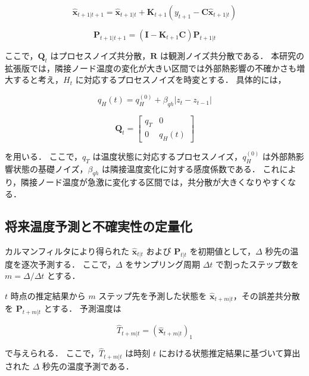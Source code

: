 \documentclass[techrep]{ipsj}
\begin{document}
\begin{equation}
\hat{\mathbf{x}}_{t+1|t+1}
=
\hat{\mathbf{x}}_{t+1|t}
+
\mathbf{K}_{t+1}
\left(
y_{t+1}
-
\mathbf{C}\hat{\mathbf{x}}_{t+1|t}
\right)
\end{equation}

\begin{equation}
\mathbf{P}_{t+1|t+1}
=
\left(
\mathbf{I}
-
\mathbf{K}_{t+1}\mathbf{C}
\right)
\mathbf{P}_{t+1|t}
\end{equation}

ここで，$\mathbf{Q}_t$ はプロセスノイズ共分散，$\mathbf{R}$ は観測ノイズ共分散である．
本研究の拡張版では，隣接ノード温度の変化が大きい区間では外部熱影響の不確かさも増大すると考え，$H_t$ に対応するプロセスノイズを時変とする．
具体的には，

\begin{equation}
q_H(t)
=
q_H^{(0)} + \beta_{qh} |z_t - z_{t-1}|
\end{equation}


\begin{equation}
\mathbf{Q}_t
=
\begin{bmatrix}
q_T & 0 \\
0 & q_H(t)
\end{bmatrix}
\end{equation}

を用いる．
ここで，$q_T$ は温度状態に対応するプロセスノイズ，$q_H^{(0)}$ は外部熱影響状態の基礎ノイズ，$\beta_{qh}$ は隣接温度変化に対する感度係数である．
これにより，隣接ノード温度が急激に変化する区間では，共分散が大きくなりやすくなる．

\subsection{将来温度予測と不確実性の定量化}

カルマンフィルタにより得られた $\hat{\mathbf{x}}_{t|t}$ および $\mathbf{P}_{t|t}$ を初期値として，$\Delta$ 秒先の温度を逐次予測する．
ここで，$\Delta$ をサンプリング周期 $\Delta t$ で割ったステップ数を $m=\Delta/\Delta t$ とする．

$t$ 時点の推定結果から $m$ ステップ先を予測した状態を $\hat{\mathbf{x}}_{t+m|t}$，その誤差共分散を $\mathbf{P}_{t+m|t}$ とする．
予測温度は

\begin{equation}
\hat{T}_{t+m|t}
=
\left(
\hat{\mathbf{x}}_{t+m|t}
\right)_1
\end{equation}

で与えられる．
ここで，$\hat{T}_{t+m|t}$ は時刻 $t$ における状態推定結果に基づいて算出された $\Delta$ 秒先の温度予測である．
\end{document}
